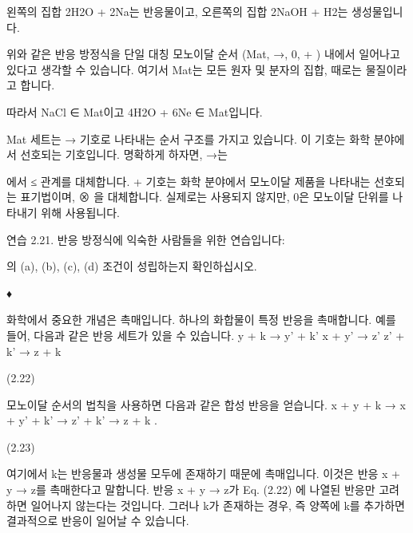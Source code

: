 \documentclass[11pt, a4paper, twoside, openany]{book}
\begin{document}
{\par\medskip
왼쪽의 집합 2H2O + 2Na\hspace{0pt}는 반응물이고, 오른쪽의 집합 2NaOH + H2\hspace{0pt}는 생성물입니다.

\par\medskip
위와 같은 반응 방정식을 단일 대칭 모노이달 순서 (Mat, →, 0, + ) 내에서 일어나고 있다고 생각할 수 있습니다. 여기서 Mat\hspace{0pt}는 모든 원자 및 분자의 집합, 때로는 물질이라고 합니다.

\par\medskip
따라서 NaCl ∈ Mat\hspace{0pt}이고
4H2O + 6Ne ∈ Mat\hspace{0pt}입니다.

\par\medskip
Mat 세트는 → 기호로 나타내는 순서 구조를 가지고 있습니다. 이 기호는 화학 분야에서 선호되는 기호입니다. 명확하게 하자면, →는 
\begin{definitionbox}[정의 2.2]
에서 ≤ 관계를 대체합니다. + 기호는 화학 분야에서 모노이달 제품을 나타내는 선호되는 표기법이며, ⊗ 을 대체합니다. 실제로는 사용되지 않지만, 0\hspace{0pt}은 모노이달 단위를 나타내기 위해 사용됩니다.
\end{definitionbox}

\par\medskip
연습 2.21.
반응 방정식에 익숙한 사람들을 위한 연습입니다: 
\begin{definitionbox}[정의 2.2]
의 (a), (b), (c), (d) 조건이 성립하는지 확인하십시오.
\end{definitionbox}

\par\medskip
♦

\par\medskip
화학에서 중요한 개념은 촉매입니다. 하나의 화합물이 특정 반응을 촉매합니다. 예를 들어, 다음과 같은 반응 세트가 있을 수 있습니다.
y + k → y' + k'
x + y' → z'
z' + k' → z + k

\par\medskip
(2.22)

\par\medskip
모노이달 순서의 법칙을 사용하면 다음과 같은 합성 반응을 얻습니다.
x + y + k → x + y' + k' → z' + k' → z + k .

\par\medskip
(2.23)

\par\medskip
여기에서 k\hspace{0pt}는 반응물과 생성물 모두에 존재하기 때문에 촉매입니다. 이것은 반응 x + y → z\hspace{0pt}를 촉매한다고 말합니다. 반응 x + y → z\hspace{0pt}가 Eq. (2.22) 에 나열된 반응만 고려하면 일어나지 않는다는 것입니다. 그러나 k\hspace{0pt}가 존재하는 경우, 즉 양쪽에 k\hspace{0pt}를 추가하면 결과적으로 반응이 일어날 수 있습니다.

}
\end{document}
